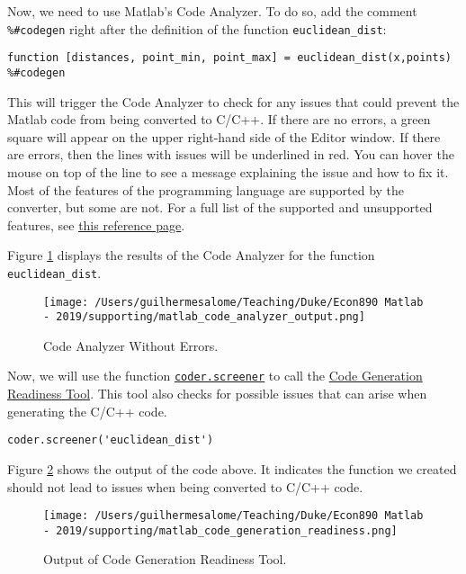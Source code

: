 \documentclass[12pt, a4paper]{article}
\begin{document}
Now, we need to use Matlab's Code Analyzer.
To do so, add the comment \texttt{\%\#codegen} right after the definition of the function \texttt{euclidean\_dist}:
\lstset{language=matlab,label= ,caption= ,captionpos=b,firstnumber=1,numbers=left,style=Matlab-editor}
\begin{lstlisting}
function [distances, point_min, point_max] = euclidean_dist(x,points) %#codegen
\end{lstlisting}
This will trigger the Code Analyzer to check for any issues that could prevent the Matlab code from being converted to C/C++.
If there are no errors, a green square will appear on the upper right-hand side of the Editor window.
If there are errors, then the lines with issues will be underlined in red.
You can hover the mouse on top of the line to see a message explaining the issue and how to fix it.
Most of the features of the programming language are supported by the converter, but some are not.
For a full list of the supported and unsupported features, see \href{https://www.mathworks.com/help/simulink/ug/matlab-language-features-supported-for-code-generation.html}{this reference page}.

Figure \ref{fig:orgd88ae96} displays the results of the Code Analyzer for the function \texttt{euclidean\_dist}.

\begin{figure}[H]
\centering
\texttt{[image: /Users/guilhermesalome/Teaching/Duke/Econ890 Matlab - 2019/supporting/matlab\_code\_analyzer\_output.png]}
\caption{\label{fig:orgd88ae96}
Code Analyzer Without Errors.}
\end{figure}

Now, we will use the function \href{https://www.mathworks.com/help/coder/ref/coder.screener.html?s\_tid=doc\_ta}{\texttt{coder.screener}} to call the \href{https://www.mathworks.com/help/coder/ug/code-generation-readiness-tool.html}{Code Generation Readiness Tool}.
This tool also checks for possible issues that can arise when generating the C/C++ code.
\lstset{language=matlab,label= ,caption= ,captionpos=b,firstnumber=1,numbers=left,style=Matlab-editor}
\begin{lstlisting}
coder.screener('euclidean_dist')
\end{lstlisting}

Figure \ref{fig:org61fcbd4} shows the output of the code above.
It indicates the function we created should not lead to issues when being converted to C/C++ code.
\begin{figure}[H]
\centering
\texttt{[image: /Users/guilhermesalome/Teaching/Duke/Econ890 Matlab - 2019/supporting/matlab\_code\_generation\_readiness.png]}
\caption{\label{fig:org61fcbd4}
Output of Code Generation Readiness Tool.}
\end{figure}
\end{document}
